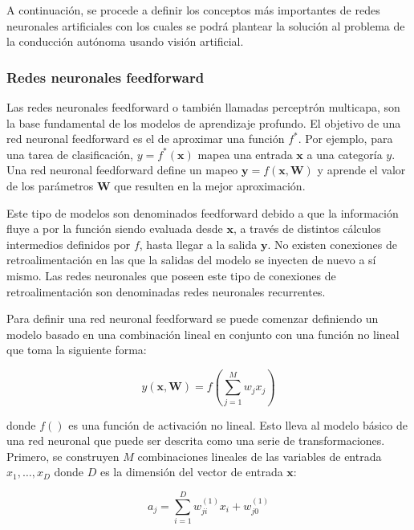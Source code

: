     A continuación, se procede a definir los conceptos más importantes de redes neuronales artificiales con los cuales se podrá 
    plantear la solución al problema de la conducción autónoma usando visión artificial.

        \subsubsection{Redes neuronales feedforward} \label{sec:feedforward}
        Las redes neuronales feedforward o también llamadas perceptrón multicapa, son la base fundamental de los modelos 
        de aprendizaje profundo. El objetivo de una red neuronal feedforward es el de aproximar una función $f^\ast$. Por 
        ejemplo, para una tarea de clasificación, $y = f^\ast (\mathbf{x})$ mapea una entrada $\mathbf{x}$ a una categoría $y$.
        Una red neuronal feedforward define un mapeo $\mathbf{y} = f(\mathbf{x},\mathbf{W})$ y aprende el valor de los parámetros 
        $\mathbf{W}$ que resulten en la mejor aproximación\cite{Goodfellow-et-al-2016}.

        Este tipo de modelos son denominados feedforward debido a que la información fluye a por la función siendo evaluada 
        desde $\mathbf{x}$, a través de distintos cálculos intermedios definidos por $f$, hasta llegar a la salida $\mathbf{y}$.
        No existen conexiones de retroalimentación en las que la salidas del modelo se inyecten de nuevo a sí mismo. Las redes 
        neuronales que poseen este tipo de conexiones de retroalimentación son denominadas redes neuronales recurrentes.

        Para definir una red neuronal feedforward se puede comenzar definiendo un modelo basado en una combinación 
        lineal en conjunto con una función no lineal que toma la siguiente forma:

        \begin{equation}\label{eq:modelobase}
            y(\mathbf{x}, \textbf{W}) = f\left(\sum_{j=1}^M w_j  x_j\right)
        \end{equation}

        donde $f()$ es una función de activación no lineal. Esto lleva al modelo básico de una red neuronal que puede ser 
        descrita como una serie de transformaciones. Primero, se construyen $M$ combinaciones lineales de las variables 
        de entrada $x_1, \ldots , x_D$ donde $D$ es la dimensión del vector de entrada $\mathbf{x}$:
        
        \begin{equation}
            a_j = \sum_{i=1}^D w_{ji}^{(1)} x_i + w_{j0}^{(1)}
        \end{equation}

